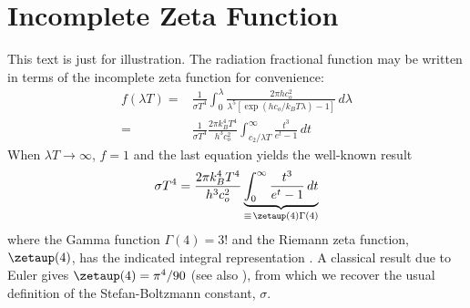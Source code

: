 \documentclass[subscriptcorrection,upint,varvw,mathalfa=cal=euler,barcolor=black,balance,hyphenate,french,pdf-a,nolists]{asmejour}
\begin{document}


\appendix   %

\section{Incomplete Zeta Function~\cite{Lienhard2019c}\label{app:zetafunction}}

This text is just for illustration. The radiation fractional function may be written in terms of the incomplete zeta function for convenience:
\begin{align}
f(\lambda T)  = {}&  \frac{1}{\sigma T^4} \int_0^\lambda\frac{2\pi h c_o^2}{\lambda^5 \left[ \exp (h c_o/k_B T \lambda) - 1\right] } \, d\lambda \\
 = {}&  \frac{1}{\sigma T^4}\frac{2\pi k_B^4 T^4}{h^3c_o^2}\int^\infty_{c_2/\lambda T}\frac{t^3}{e^t -1}\, dt\label{eqn:zeta}
\end{align}
When $\lambda T \rightarrow \infty$, $f = 1$ and the last equation yields the well-known result
\begin{equation}
 {\sigma T^4} =\frac{2\pi k_B^4 T^4}{h^3c_o^2} \underbrace{\int_0^\infty \frac{t^3}{e^t - 1} \, dt}_{\equiv\mspace{2mu} \zetaup(4)\Gamma(4)}
\end{equation}
where the Gamma function $\Gamma(4) = 3!$ and the Riemann zeta function, $\zetaup(4)$, has the indicated integral representation \cite[\S13.12]{ww1927}.  A classical result due to Euler \cite{euler1740} gives $\zetaup(4) = \pi^4/90$ (see also \cite[\S167]{euler1748}), from which we recover the usual definition of the  Stefan-Boltzmann constant, $\sigma$.
\end{document}
